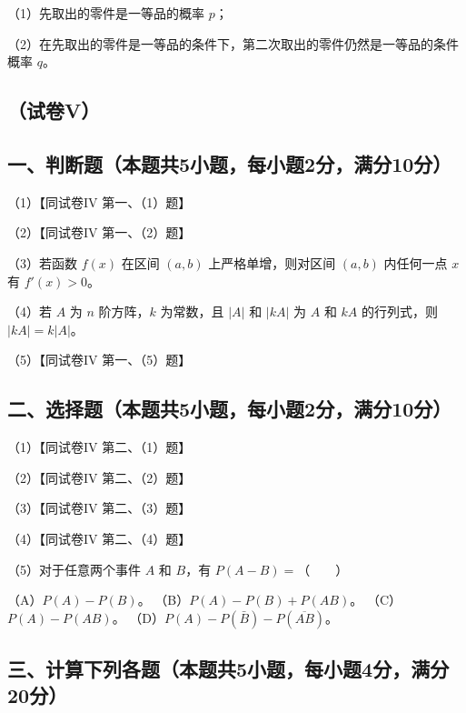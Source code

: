 \documentclass[UTF8,12pt]{ctexart}
\begin{document}
（1）先取出的零件是一等品的概率 \(\displaystyle p\)；


（2）在先取出的零件是一等品的条件下，第二次取出的零件仍然是一等品的条件概率 \(\displaystyle q\)。


\subsection*{（试卷V）}

\subsection*{一、判断题（本题共5小题，每小题2分，满分10分）}

（1）【同试卷IV 第一、（1）题】


（2）【同试卷IV 第一、（2）题】


（3）若函数 \(\displaystyle f(x)\) 在区间 \(\displaystyle (a,\allowbreak b)\) 上严格单增，则对区间 \(\displaystyle (a,\allowbreak b)\) 内任何一点 \(\displaystyle x\) 有 \(\displaystyle f\prime(x)>0\)。


（4）若 \(\displaystyle A\) 为 \(\displaystyle n\) 阶方阵，\(\displaystyle k\) 为常数，且 \(\displaystyle |A|\) 和 \(\displaystyle |kA|\) 为 \(\displaystyle A\) 和 \(\displaystyle kA\) 的行列式，则 \(\displaystyle |kA|=k|A|\)。


（5）【同试卷IV 第一、（5）题】


\subsection*{二、选择题（本题共5小题，每小题2分，满分10分）}

（1）【同试卷IV 第二、（1）题】


（2）【同试卷IV 第二、（2）题】


（3）【同试卷IV 第二、（3）题】


（4）【同试卷IV 第二、（4）题】


（5）对于任意两个事件 \(\displaystyle A\) 和 \(\displaystyle B\)，有 \(\displaystyle P(A-B)=\)（　　）


（A）\(\displaystyle P(A)-P(B)\)。 （B）\(\displaystyle P(A)-P(B)+P(AB)\)。 （C）\(\displaystyle P(A)-P(AB)\)。 （D）\(\displaystyle P(A)-P(\bar B)-P(\overline{AB})\)。


\subsection*{三、计算下列各题（本题共5小题，每小题4分，满分20分）}
\end{document}
